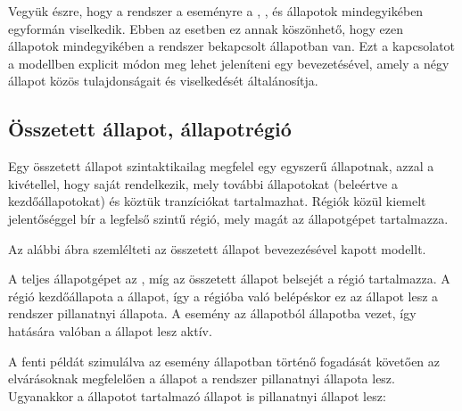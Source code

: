 Vegyük észre, hogy a rendszer a  eseményre a , ,  és  állapotok mindegyikében egyformán viselkedik. Ebben az esetben ez annak köszönhető, hogy ezen állapotok mindegyikében a rendszer bekapcsolt állapotban van. Ezt a kapcsolatot a modellben explicit módon meg lehet jeleníteni egy  bevezetésével, amely a négy állapot közös tulajdonságait és viselkedését általánosítja.

\subsection{Összetett állapot, állapotrégió}

Egy összetett állapot szintaktikailag megfelel egy egyszerű állapotnak, azzal a kivétellel, hogy saját  rendelkezik, mely további állapotokat (beleértve a kezdőállapotokat) és köztük tranzíciókat tartalmazhat. Régiók közül kiemelt jelentőséggel bír a legfelső szintű régió, mely magát az állapotgépet tartalmazza.

\begin{megjegyzes}
	Az alábbi ábra szemlélteti az  összetett állapot bevezezésével kapott modellt.

	A teljes állapotgépet az , míg az összetett állapot belsejét a  régió tartalmazza. A  régió kezdőállapota a  állapot, így a régióba való belépéskor ez az állapot lesz a rendszer pillanatnyi állapota. A  esemény az  állapotból  állapotba vezet, így hatására valóban a  állapot lesz aktív.
\end{megjegyzes}
 	

\begin{megjegyzes}
A fenti példát szimulálva az  esemény  állapotban történő fogadását követően az elvárásoknak megfelelően a  állapot a rendszer pillanatnyi állapota lesz. Ugyanakkor a  állapotot tartalmazó  állapot is pillanatnyi állapot lesz:
\end{megjegyzes}


